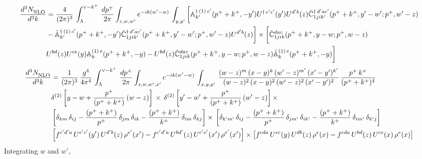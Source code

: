 \documentclass[10pt]{article}
\def\mf#1{\mathbb{#1}}
\begin{document}
\begin{align}
    \frac{d^{3}N_{\rm NLO}^{\rm}}{d^{3}k}  & = \frac{4}{(2\pi)^{3}}\,\int_{\Lambda}^{\vee-k^{+}}\, \frac{dp^{+}}{2\pi}\int_{z,w,w^{\prime}} e^{-ik(w^{\prime}-w)}\,  \int_{y,y^{\prime}}\bigg[\mf{A}^{\dagger\, (1)\,e^{\prime}}_{k^{\prime}}(p^{+}+k^{+},-y^{\prime})U^{\dagger\, e^{\prime}c^{\prime}}(y^{\prime})U^{d^{\prime}b}(z) \Bar{\mf{C}}^{\dagger\, d^{\prime}ac^{\prime}}_{1jik^{\prime}}(p^{+}+k^{+},y^{\prime}-w^{\prime}; p^{+},w^{\prime}-z) \notag \\ &  -\Bar{\mf{A}}^{\dagger\, (1)\,c^{\prime}}_{k^{\prime}}(p^{+}+k^{+},-y^{\prime}) \Bar{\mf{C}}^{\dagger\, d^{\prime}ac^{\prime}}_{1jik^{\prime}}(p^{+}+k^{+},y^{\prime}-w^{\prime}; p^{+},w^{\prime}-z)U^{d^{\prime}b}(z)\bigg]\times\bigg[\Bar{\mf{C}}^{dac}_{1jik}(p^{+}+k^{+},y-w; p^{+},w-z)\notag \\ & U^{bd}(z)U^{ce}(y) \mf{A}^{(1)\,e}_{k}(p^{+}+k^{+},-y) -U^{bd}(z) \Bar{\mf{C}}^{dac}_{1jik}(p^{+}+k^{+},y-w; p^{+},w-z)\Bar{\mf{A}}^{(1)\,c}_{k}(p^{+}+k^{+},-y)\bigg]\nonumber
\end{align}
\begin{align}
     \frac{d^{3}N_{\rm NLO}^{\rm}}{d^{3}k}  & = \frac{1}{(2\pi)^{3}}\,\frac{g^{4}}{4\pi^{4}}\,\int_{\Lambda}^{\vee-k^{+}}\, \frac{dp^{+}}{2\pi}\int_{z,w,w^{\prime},x'} e^{-ik(w^{\prime}-w)}\,  \int_{x,y,y^{\prime}}\,\frac{(w-z)^{m}\,(x-y)^{k}\,(w'-z)^{m'}\,(x'-y')^{k'}}{(w-z)^{2}\,(x-y)^{2}\,(w'-z)^{2}\,(x'-y')^{2}}\,\frac{p^{+}\,k^{+}}{(p^{+}+k^{+})^{4}}\notag \\ & \delta^{(2)}\left[y-w+\frac{p^{+}}{(p^{+}+k^{+})}\,(w-z)\right]\,\times\, \delta^{(2)}\left[y'-w'+\frac{p^{+}}{(p^{+}+k^{+})}\,(w'-z)\right]\times\notag \\ &  \left[\delta_{km}\,\delta_{ij}-\frac{(p^{+}+k^{+})}{p^{+}}\,\delta_{jm}\,\delta_{ik}-\frac{(p^{+}+k^{+})}{k^{+}}\,\delta_{im}\,\delta_{kj}\right]\times\, \left[\delta_{k'm'}\,\delta_{ij}-\frac{(p^{+}+k^{+})}{p^{+}}\,\delta_{jm'}\,\delta_{ik'}-\frac{(p^{+}+k^{+})}{k^{+}}\,\delta_{im'}\,\delta_{k'j}\right]\notag \\ & \left[f^{c'd'a}\,U^{e'c'}(y')\,U^{d'b}(z)\,\rho^{e'}(x')-f^{c'd'a}\, 
    U^{bd'}(z)\,U^{c'e'}(x')\,\rho^{e'}(x')\right]\times \left[f^{cda}\,U^{ec}(y)\,U^{db}(z)\,\rho^{e}(x)-f^{cda}\, 
    U^{bd}(z)\,U^{ce}(x)\,\rho^{e}(x)\right]
\end{align}
Integrating $w$ and $w'$,
\end{document}
